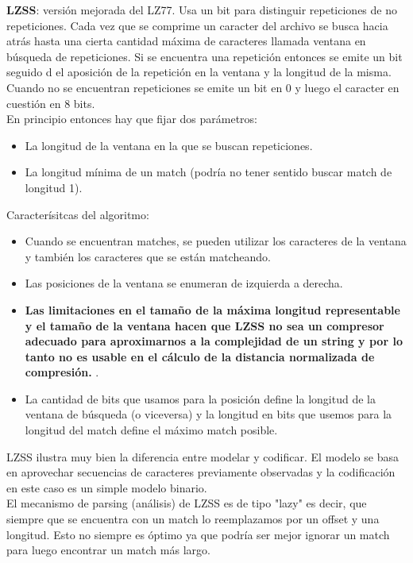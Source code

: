 \documentclass[titlepage,a4paper]{article}
\begin{document}
\textbf{LZSS}: versión mejorada del LZ77. Usa un bit para distinguir repeticiones de no repeticiones. Cada vez que se comprime un caracter del archivo se busca hacia atrás hasta una cierta cantidad máxima de caracteres llamada ventana en búsqueda de repeticiones.  Si se  encuentra una repetición entonces se emite un bit seguido d el aposición de la repetición en la ventana y la longitud de la misma. Cuando no se encuentran repeticiones se emite un bit en 0 y luego el caracter en cuestión en 8 bits. \\

En principio entonces hay que fijar dos parámetros: \\
\begin{itemize}
\item La longitud de la ventana en la que se buscan repeticiones. 
\item La longitud mínima de un match (podría no tener sentido buscar match de longitud 1). 
\end{itemize} 
Caracterísitcas del algoritmo: 
\begin{itemize}
\item Cuando se encuentran matches, se pueden utilizar los caracteres de la ventana y también los caracteres que se están matcheando. 
\item Las posiciones de la ventana se enumeran de izquierda a derecha. 
\item \textbf{Las limitaciones en el tamaño de la máxima longitud representable y el tamaño de la ventana hacen que LZSS no sea un compresor adecuado para aproximarnos a la complejidad de un string y por lo tanto no es usable en el cálculo de la distancia normalizada de compresión. }.
\item La cantidad de bits que usamos para la posición define la longitud de la ventana de búsqueda (o viceversa) y la longitud en bits que usemos para la longitud del match define el máximo match posible. 
\end{itemize}

LZSS ilustra muy bien la diferencia entre modelar y codificar. El modelo se basa en aprovechar secuencias de caracteres previamente observadas y la codificación en este caso es un simple modelo binario. \\

El mecanismo de parsing (análisis) de LZSS es de tipo "lazy" es decir, que siempre que se encuentra con un match lo reemplazamos por un offset y una longitud. Esto no siempre es óptimo ya que podría ser mejor ignorar un match para luego encontrar un match más largo. \\
\end{document}
